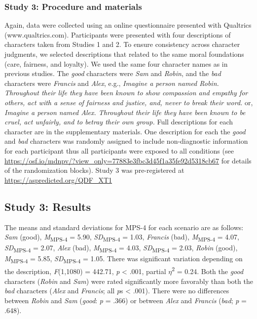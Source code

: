 \documentclass[
  english,
  man,floatsintext]{apa7}
\begin{document}
\hypertarget{study-3-procedure-and-materials}{%
\subsubsection{Study 3: Procedure and materials}\label{study-3-procedure-and-materials}}

Again, data were collected using an online questionnaire presented with Qualtrics (www.qualtrics.com). Participants were presented with four descriptions of characters taken from Studies 1 and 2. To ensure consistency across character judgments, we selected descriptions that related to the same moral foundations (care, fairness, and loyalty). We used the same four character names as in previous studies. The \emph{good} characters were \emph{Sam} and \emph{Robin}, and the \emph{bad} characters were \emph{Francis} and \emph{Alex}, e.g., \emph{Imagine a person named Robin. Throughout their life they have been known to show compassion and empathy for others, act with a sense of fairness and justice, and, never to break their word.} or, \emph{Imagine a person named Alex. Throughout their life they have been known to be cruel, act unfairly, and to betray their own group.} Full descriptions for each character are in the supplementary materials. One description for each the \emph{good} and \emph{bad} characters was randomly assigned to include non-diagnostic information for each participant thus all participants were exposed to all conditions (see \color{blue}\url{https://osf.io/mdnpv/?view_only=77883e3fbc3d45f1a35fe92d5318cb67}\color{black} for details of the randomization blocks). Study 3 was pre-registered at \color{blue}\url{https://aspredicted.org/QDF_XT1}\color{black}

\hypertarget{study-3-results}{%
\subsection{Study 3: Results}\label{study-3-results}}

The means and standard deviations for MPS-4 for each scenario are as follows:
\emph{Sam} (good),
\emph{M}\textsubscript{MPS-4} = 5.90, \emph{SD}\textsubscript{MPS-4} = 1.03,
\emph{Francis} (bad),
\emph{M}\textsubscript{MPS-4} = 4.07, \emph{SD}\textsubscript{MPS-4} = 2.07,
\emph{Alex} (bad),
\emph{M}\textsubscript{MPS-4} = 4.03, \emph{SD}\textsubscript{MPS-4} = 2.03,
\emph{Robin} (good),
\emph{M}\textsubscript{MPS-4} = 5.85, \emph{SD}\textsubscript{MPS-4} = 1.05. There was significant variation depending on the description, \emph{F}(1,1080) = 442.71, \emph{p} \textless{} .001, partial \(\eta\)\textsuperscript{2} = 0.24. Both the \emph{good} characters (\emph{Robin} and \emph{Sam}) were rated significantly more favorably than both the \emph{bad} characters (\emph{Alex} and \emph{Francis}; all \emph{p}s \textless{} .001). There were no differences between \emph{Robin} and \emph{Sam} (\emph{good}: \emph{p} = .366) or between \emph{Alex} and \emph{Francis} (\emph{bad}; \emph{p} = .648).
\end{document}
